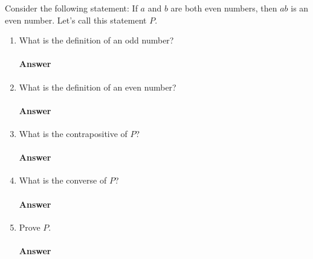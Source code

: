 \documentclass{article}
\begin{document}
\collab{\todo{}}
Consider the following statement: If $a$ and $b$ are both even numbers, then $ab$ is
an even number.  Let's call this statement $P$.
\begin{enumerate}
    \item What is the definition of an odd number?

        \paragraph{Answer}
        \todo{}

    \item What is the definition of an even number?

        \paragraph{Answer}
        \todo{}

    \item What is the contrapositive of $P$?

        \paragraph{Answer}
        \todo{}

    \item What is the converse of $P$?

        \paragraph{Answer}
        \todo{}

    \item Prove $P$.

        \paragraph{Answer}
        \todo{}

\end{enumerate}
\end{document}

